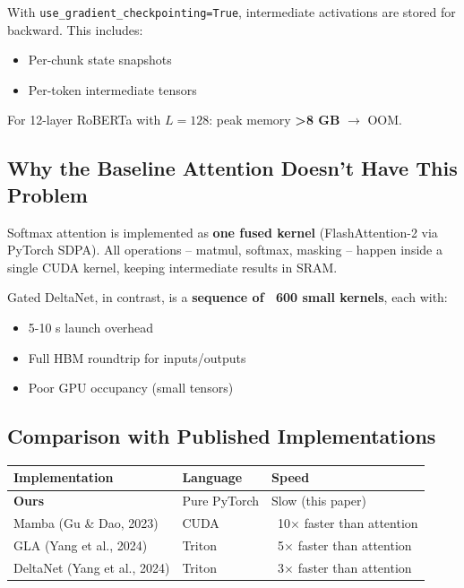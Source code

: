 With \texttt{use\_gradient\_checkpointing=True}, intermediate activations are stored 
for backward. This includes:
\begin{itemize}
\item Per-chunk state snapshots
\item Per-token intermediate tensors

\end{itemize}
For 12-layer RoBERTa with $L=128$: peak memory \textbf{\textgreater{}8 GB} $\to$ OOM.

\subsection{Why the Baseline Attention Doesn't Have This Problem}

Softmax attention is implemented as \textbf{one fused kernel} (FlashAttention-2 
via PyTorch SDPA). All operations -- matmul, softmax, masking -- happen 
inside a single CUDA kernel, keeping intermediate results in SRAM.

Gated DeltaNet, in contrast, is a \textbf{sequence of ~600 small kernels}, each 
with:
\begin{itemize}
\item 5-10  s launch overhead
\item Full HBM roundtrip for inputs/outputs
\item Poor GPU occupancy (small tensors)

\end{itemize}
\subsection{Comparison with Published Implementations}

\begin{table}[H]
\centering
\small
\begin{tabular}{lll}
\toprule
\textbf{Implementation} & \textbf{Language} & \textbf{Speed} \\
\midrule
\textbf{Ours} & Pure PyTorch & Slow (this paper) \\
Mamba (Gu \& Dao, 2023) & CUDA & ~10$\times$ faster than attention \\
GLA (Yang et al., 2024) & Triton & ~5$\times$ faster than attention \\
DeltaNet (Yang et al., 2024) & Triton & ~3$\times$ faster than attention \\
\bottomrule
\end{tabular}
\end{table}

